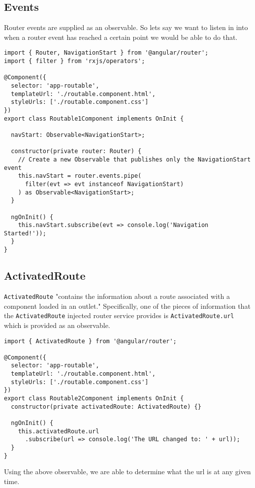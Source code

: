 \subsection{Events}
Router events are supplied as an observable. So lets say we want to listen in into when a router event has reached a certain point we would be able to do that. 
\begin{lstlisting}
import { Router, NavigationStart } from '@angular/router';
import { filter } from 'rxjs/operators';

@Component({
  selector: 'app-routable',
  templateUrl: './routable.component.html',
  styleUrls: ['./routable.component.css']
})
export class Routable1Component implements OnInit {

  navStart: Observable<NavigationStart>;

  constructor(private router: Router) {
    // Create a new Observable that publishes only the NavigationStart event
    this.navStart = router.events.pipe(
      filter(evt => evt instanceof NavigationStart)
    ) as Observable<NavigationStart>;
  }

  ngOnInit() {
    this.navStart.subscribe(evt => console.log('Navigation Started!'));
  }
}
\end{lstlisting}

\subsection{ ActivatedRoute }
\lstinline{ActivatedRoute} "contains the information about a route associated with a component loaded in an outlet." Specifically, one of the pieces of information that the \lstinline{ActivatedRoute} injected router service provides is \lstinline{ActivatedRoute.url} which is provided as an observable. 

\begin{lstlisting}
import { ActivatedRoute } from '@angular/router';

@Component({
  selector: 'app-routable',
  templateUrl: './routable.component.html',
  styleUrls: ['./routable.component.css']
})
export class Routable2Component implements OnInit {
  constructor(private activatedRoute: ActivatedRoute) {}

  ngOnInit() {
    this.activatedRoute.url
      .subscribe(url => console.log('The URL changed to: ' + url));
  }
}
\end{lstlisting}
Using the above observable, we are able to determine what the url is at any given time. 

